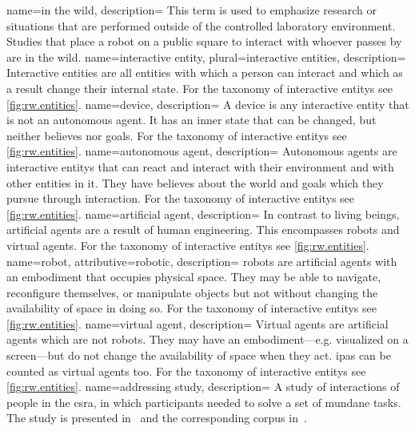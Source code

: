 {
	name={in the wild},
	description={
		This term is used to emphasize research or situations that are performed outside of the controlled laboratory environment.
		Studies that place a \gls{robot} on a public square to interact with whoever passes by are \gls{in the wild}.
		}
}
{
	name={interactive entity},
	plural={interactive entities},
	description={
		Interactive entities are all entities with which a person can interact and which as a result change their internal state.
		For the taxonomy of \glspl{interactive entity} see \cref{fig:rw.entities}.
	}
}
{
	name={device},
	description={
		A \gls{device} is any \gls{interactive entity} that is not an \gls{autonomous agent}.
		It has an inner state that can be changed, but neither believes nor goals.
		For the taxonomy of \glspl{interactive entity} see \cref{fig:rw.entities}.
	}
}
{
	name={autonomous agent},
	description={
		Autonomous agents are \glspl{interactive entity} that can react and interact with their environment and with other entities in it.
		They have believes about the world and goals which they pursue through interaction.
		For the taxonomy of \glspl{interactive entity} see \cref{fig:rw.entities}.
	}
}
{
	name={artificial agent},
	description={
		In contrast to living beings, \glspl{artificial agent} are a result of  human engineering.
		This encompasses \glspl{robot} and \glspl{virtual agent}.
		For the taxonomy of \glspl{interactive entity} see \cref{fig:rw.entities}.
	}
}
{
	name={robot},
	attributive={robotic},
	description={
		\Glspl{robot} are \glspl{artificial agent} with an embodiment that occupies physical space.
		They may be able to navigate, reconfigure themselves, or manipulate objects but not without changing the availability of space in doing so.
		For the taxonomy of \glspl{interactive entity} see \cref{fig:rw.entities}.
	}
}
{
	name={virtual agent},
	description={
		Virtual agents are \glspl{artificial agent} which are not \glspl{robot}.
		They may have an embodiment---e.g. visualized on a screen---but do not change the availability of space when they act.
		\Glspl{ipa} can be counted as \glspl{virtual agent} too.
		For the taxonomy of \glspl{interactive entity} see \cref{fig:rw.entities}.
	}
}
{
	name={addressing study},
	description={
		A study of interactions of \naive{} people in the \gls{csra}, in which participants needed to solve a set of mundane tasks.
		The study is presented in~\cite{Bernotat2016} and the corresponding corpus in~\cite{Holthaus2016a}.
		}
}
